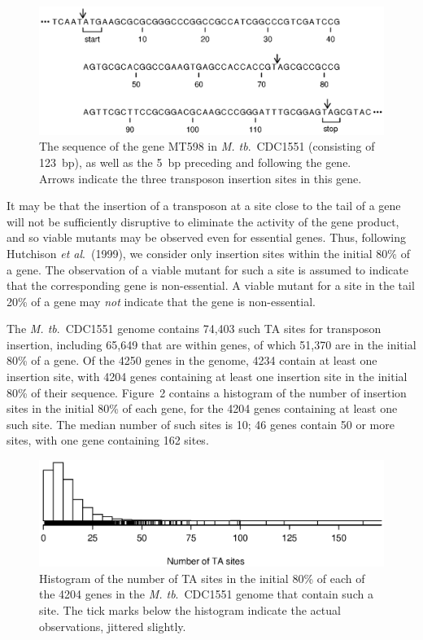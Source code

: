 \documentclass[letterpaper]{article}
\begin{document}
\begin{multicols}{2}
\begin{figure}[tbh]
\begin{center}
\includegraphics[scale=0.9]{Figs/fig1.ps}
\caption{The sequence of the gene MT598 in \emph{M. tb}.\ CDC1551
(consisting of 123~bp), as well as the 5~bp preceding and following
the gene.  Arrows indicate the three transposon insertion sites in
this gene.}
\end{center}
\end{figure}


It may be that the insertion of a transposon at a site close to the
tail of a gene will not be sufficiently disruptive to eliminate the
activity of the gene product, and so viable mutants may be observed
even for essential genes.  Thus, following Hutchison \emph{et al}.\
(1999), we consider only insertion sites within the initial 80\% of a
gene.  The observation of a viable mutant for such a site is assumed
to indicate that the corresponding gene is non-essential.  A viable
mutant for a site in the tail 20\% of a gene may \emph{not\/} indicate
that the gene is non-essential.
 
The \emph{M. tb}.\ CDC1551 genome contains 74,403 such TA sites for
transposon insertion, including 65,649 that are within genes, of which
51,370 are in the initial 80\% of a gene.  Of the 4250 genes in the
genome, 4234 contain at least one insertion site, with 4204 genes
containing at least one insertion site in the initial 80\% of their
sequence.  Figure~2 contains a histogram of the number of insertion
sites in the initial 80\% of each gene, for the 4204 genes containing
at least one such site.  The median number of such sites is 10; 46
genes contain 50 or more sites, with one gene containing 162 sites.

\begin{figure}[tbh]
\begin{center}
\includegraphics{Figs/fig2.ps}
\caption{Histogram of the number of TA sites in the initial 80\% of
each of the 4204 genes in the \emph{M. tb}.\ CDC1551 genome that
contain such a site.  The tick marks below the histogram indicate the
actual observations, jittered slightly.}
\end{center}
\end{figure}


\end{multicols}
\end{document}
